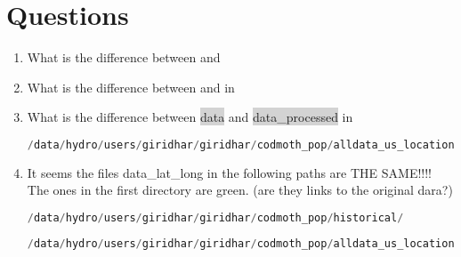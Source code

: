 \section{Questions}

\begin{enumerate}
\item What is the difference between 
 and 

\item What is the difference between  
and  in 

\item What is the difference between {\scriptsize{\colorbox{lightgray}{data}}} and {\scriptsize{\colorbox{lightgray}{data\_processed}}} in 

{\scriptsize \begin{lstlisting}[backgroundcolor = \color{lightgray},
                   language = C,
                   xleftmargin = .5cm,
                   xrightmargin = 1.2cm,
                   framexleftmargin = .05cm]
/data/hydro/users/giridhar/giridhar/codmoth_pop/alldata_us_locations
\end{lstlisting}}

\item It seems the files data\_lat\_long in the following paths are THE SAME!!!!
The ones in the first directory are green. (are they links to the original dara?)

\scriptsize \begin{lstlisting}[backgroundcolor = \color{lightgray},
                   language = C,
                   xleftmargin = .1cm,
                   xrightmargin = 3.5cm,
                   framexleftmargin = .05cm]
/data/hydro/users/giridhar/giridhar/codmoth_pop/historical/
\end{lstlisting}

\scriptsize \begin{lstlisting}[backgroundcolor = \color{lightgray},
                   language = C,
                   xleftmargin = .05cm,
                   xrightmargin = -1.25cm,
                   framexleftmargin = .05cm]
/data/hydro/users/giridhar/giridhar/codmoth_pop/alldata_us_locations/data/historical/
\end{lstlisting}


\end{enumerate}